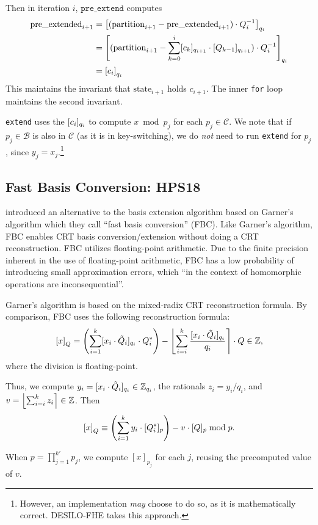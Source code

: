 \documentclass[../../fheimpl.tex]{subfiles}
\begin{document}
Then in iteration $i$, $\texttt{pre\_extend}$ computes 
\begin{align*}
	\mathrm{pre\_extended}_{i+1} &= \bracks*{(\mathrm{partition}_{i+1} - \mathrm{pre\_extended}_{i+1})\cdot Q_{i}^{-1}}_{q_i} \\
	&= \bracks*{(\mathrm{partition}_{i+1} - \sum_{k=0}^i \bracks{c_k}_{q_{i+1}}\cdot\bracks{Q_{k-1}}_{q_{i+1}})\cdot Q_{i}^{-1}}_{q_i} \\
	&= \bracks*{c_i}_{q_i}
\end{align*}
This maintains the invariant that $\mathrm{state}_{i+1}$ holds $c_{i+1}$. The inner \texttt{for} loop maintains the second invariant.

\texttt{extend} uses the $\bracks{c_i}_{q_i}$ to compute $x \bmod p_j$ for each $p_j\in \mathcal{C}$. We note that if $p_j\in\mathcal{B}$ is also in $\mathcal{C}$ (as it is in key-switching), we do \emph{not} need to run \texttt{extend} for $p_j$, since $y_j=x_j$.\footnote{However, an implementation \emph{may} choose to do so, as it is mathematically correct. DESILO-FHE takes this approach.} 

\subsection{Fast Basis Conversion: HPS18}
\cite{cryptoeprint:2018/117} introduced an alternative to the basis extension algorithm based on Garner's algorithm which they call ``fast basis conversion'' (FBC). Like Garner's algorithm, FBC enables CRT basis conversion/extension without doing a CRT reconstruction. FBC utilizes floating-point arithmetic. Due to the finite precision inherent in the use of floating-point arithmetic, FBC has a low probability of introducing small approximation errors, which ``in the context of homomorphic operations are inconsequential''.

Garner's algorithm is based on the mixed-radix CRT reconstruction formula. By comparison, FBC uses the following reconstruction formula:
\[\bracks*{x}_Q = \parens*{\sum_{i=1}^k[x_i\cdot\tilde{Q}_i]_{q_i}\cdot Q_i^*}-\round*{\sum_{i=i}^k\frac{[x_i\cdot\tilde{Q}_i]_{q_i}}{q_i}}\cdot Q\in \Z,\]
where the division is floating-point.	

Thus, we compute $y_i=[x_i\cdot\tilde{Q}_i]_{q_i}\in \Z_{q_i}$, the rationals $z_i=y_i/q_i$, and $v=\round*{\sum_{i=i}^kz_i}\in\Z$. Then 
\[\bracks*{x}_Q \equiv \parens*{\sum_{i=1}^k y_i\cdot [Q_i^*]_p}-v\cdot [Q]_p\bmod p.\]

When $p=\prod_{j=1}^{k'} p_j$, we compute $[x]_{p_j}$ for each $j$, reusing the precomputed value of $v$.
\end{document}
